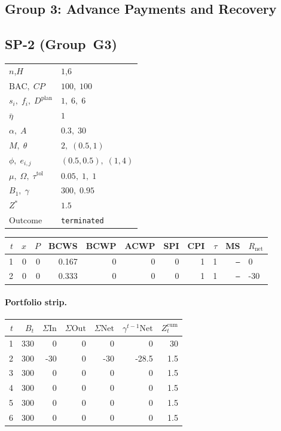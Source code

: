 \documentclass[12pt, a4paper]{article}
\newcommand{\BAC}{\mathrm{BAC}}
\begin{document}
\newpage


\subsection*{Group 3: Advance Payments and Recovery}

\subsection*{SP-2  (Group~G3)}
\begin{center}
\begin{tabular}{ll}
\toprule
$n$,\;$H$ & $1$,\;$6$ \\
$\BAC,\;CP$ & $100,\;100$ \\
$s_i,\;f_i,\;D^{\mathrm{plan}}$ & $1,\;6,\;6$ \\
$\bar\eta$ & $1$ \\
$\alpha,\;A$ & $0.3,\;30$ \\
$M,\;\theta$ & $2,\;(0.5,1)$ \\
$\phi,\;e_{i,j}$ & $(0.5,0.5),\;(1,4)$ \\
$\mu,\;\Omega,\;\tau^{\mathrm{tol}}$ & $0.05,\;1,\;1$ \\
$B_1,\;\gamma$ & $300,\;0.95$ \\
$Z^*$ & $1.5$ \\
Outcome & \texttt{terminated} \\
\bottomrule
\end{tabular}
\end{center}

\begin{center}
\begin{tabular}{rrrrrrrrrrl}
\toprule
$t$ & $x$ & $P$ & BCWS & BCWP & ACWP & SPI & CPI & $\tau$ & MS & $R_{\mathrm{net}}$\\
\midrule
1 & 0 & 0 & 0.167 & 0 & 0 & 0 & 1 & 1 & \texttt{---} & 0 \\
2 & 0 & 0 & 0.333 & 0 & 0 & 0 & 1 & 1 & \texttt{---} & -30 \\
\bottomrule
\end{tabular}
\end{center}
\paragraph{Portfolio strip.}
\begin{center}
\begin{tabular}{rrrrrrr}
\toprule
$t$ & $B_t$ & $\Sigma\mathrm{In}$ & $\Sigma\mathrm{Out}$ & $\Sigma\mathrm{Net}$ & $\gamma^{t-1}\mathrm{Net}$ & $Z_t^{\mathrm{cum}}$\\
\midrule
1 & 330 & 0 & 0 & 0 & 0 & 30 \\
2 & 300 & -30 & 0 & -30 & -28.5 & 1.5 \\
3 & 300 & 0 & 0 & 0 & 0 & 1.5 \\
4 & 300 & 0 & 0 & 0 & 0 & 1.5 \\
5 & 300 & 0 & 0 & 0 & 0 & 1.5 \\
6 & 300 & 0 & 0 & 0 & 0 & 1.5 \\
\bottomrule
\end{tabular}
\end{center}
\end{document}
